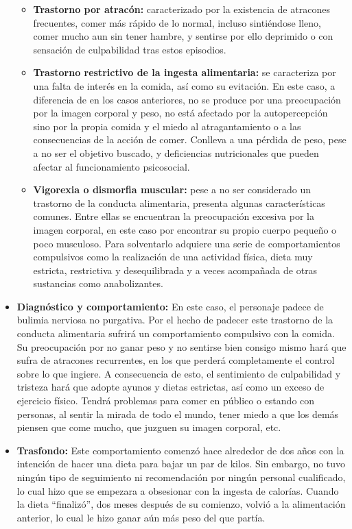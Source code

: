 \documentclass[12pt, a4paper,twoside,titlepage]{book}
\begin{document}
\begin{itemize}
{\begin{itemize}
            \item {\textbf{Trastorno por atracón:}  caracterizado por la existencia de atracones frecuentes, comer más rápido de lo normal, incluso sintiéndose lleno, comer mucho aun sin tener hambre, y sentirse por ello deprimido o con sensación de culpabilidad tras estos episodios. }    
             \item {\textbf{Trastorno restrictivo de la ingesta alimentaria:}  se caracteriza por una falta de interés en la comida, así como su evitación. En este caso, a diferencia de en los casos anteriores, no se produce por una preocupación por la imagen corporal y peso, no está afectado por la autopercepción sino por la propia comida y el miedo al atragantamiento o a las consecuencias de la acción de comer. Conlleva a una pérdida de peso, pese a no ser el objetivo buscado, y deficiencias nutricionales que pueden afectar al funcionamiento psicosocial.}
             \item {\textbf{Vigorexia o dismorfia muscular:}  pese a no ser considerado un trastorno de la conducta alimentaria, presenta algunas características comunes. Entre ellas se encuentran la preocupación excesiva por la imagen corporal, en este caso por encontrar su propio cuerpo pequeño o poco musculoso. Para solventarlo adquiere una serie de comportamientos compulsivos como la realización de una actividad física, dieta muy estricta, restrictiva y desequilibrada y a veces acompañada de otras sustancias como anabolizantes. } 
        \end{itemize}
    
    }
    \item {\textbf{Diagnóstico y comportamiento:}
     En este caso, el personaje padece de bulimia nerviosa no purgativa. Por el hecho de padecer este trastorno de la conducta alimentaria sufrirá un comportamiento compulsivo con la comida. Su preocupación por no ganar peso y no sentirse bien consigo mismo hará que sufra de atracones recurrentes, en los que perderá completamente el control sobre lo que ingiere. A consecuencia de esto, el sentimiento de culpabilidad y tristeza hará que adopte ayunos y dietas estrictas, así como un exceso de ejercicio físico. Tendrá problemas para comer en público o estando con personas, al sentir la mirada de todo el mundo, tener miedo a que los demás piensen que come mucho, que juzguen su imagen corporal, etc.  
     }
    \item {\textbf{Trasfondo:}
    Este comportamiento comenzó hace alrededor de dos años con la intención de hacer una dieta para bajar un par de kilos. Sin embargo, no tuvo ningún tipo de seguimiento ni recomendación por ningún personal cualificado, lo cual hizo que se empezara a obsesionar con la ingesta de calorías. Cuando la dieta “finalizó”, dos meses después de su comienzo, volvió a la alimentación anterior, lo cual le hizo ganar aún más peso del que partía.
    
}
\end{itemize}
\end{document}
